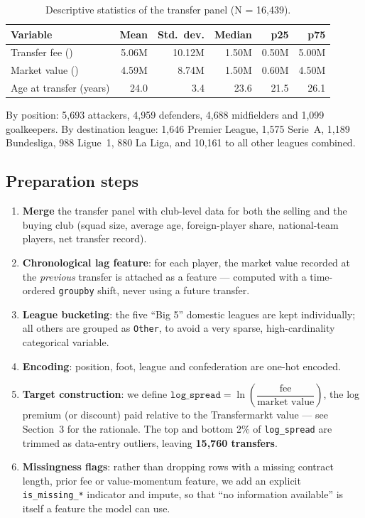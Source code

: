 \documentclass[11pt]{article}
\begin{document}
\begin{table}[H]
\centering
\caption{Descriptive statistics of the transfer panel (N = 16{,}439).}
\label{tab:descriptive}
\begin{tabular}{lrrrrr}
\toprule
Variable & Mean & Std.\ dev. & Median & p25 & p75 \\
\midrule
Transfer fee (\texteuro{}) & 5.06M & 10.12M & 1.50M & 0.50M & 5.00M \\
Market value (\texteuro{}) & 4.59M & 8.74M & 1.50M & 0.60M & 4.50M \\
Age at transfer (years) & 24.0 & 3.4 & 23.6 & 21.5 & 26.1 \\
\bottomrule
\end{tabular}
\end{table}
\vspace{-2mm}
\noindent By position: 5{,}693 attackers, 4{,}959 defenders, 4{,}688 midfielders and
1{,}099 goalkeepers. By destination league: 1{,}646 Premier League, 1{,}575
Serie~A, 1{,}189 Bundesliga, 988 Ligue~1, 880 La Liga, and 10{,}161 to all
other leagues combined.

\subsection{Preparation steps}
\begin{enumerate}
    \item \textbf{Merge} the transfer panel with club-level data for both the
    selling and the buying club (squad size, average age, foreign-player
    share, national-team players, net transfer record).
    \item \textbf{Chronological lag feature}: for each player, the market value
    recorded at the \emph{previous} transfer is attached as a feature ---
    computed with a time-ordered \texttt{groupby} shift, never using a future
    transfer.
    \item \textbf{League bucketing}: the five ``Big 5'' domestic leagues are
    kept individually; all others are grouped as \texttt{Other}, to avoid a
    very sparse, high-cardinality categorical variable.
    \item \textbf{Encoding}: position, foot, league and confederation are
    one-hot encoded.
    \item \textbf{Target construction}: we define
    $\texttt{log\_spread} = \ln\!\left(\dfrac{\text{fee}}{\text{market value}}\right)$,
    the log premium (or discount) paid relative to the Transfermarkt value ---
    see Section~3 for the rationale. The top and bottom 2\% of
    \texttt{log\_spread} are trimmed as data-entry outliers, leaving
    \textbf{15{,}760 transfers}.
    \item \textbf{Missingness flags}: rather than dropping rows with a missing
    contract length, prior fee or value-momentum feature, we add an explicit
    \texttt{is\_missing\_*} indicator and impute, so that ``no information
    available'' is itself a feature the model can use.
\end{enumerate}
\end{document}
